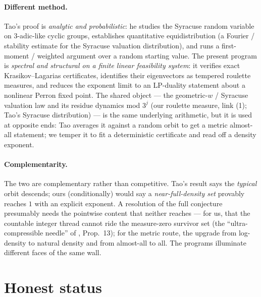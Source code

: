 \documentclass[11pt]{article}
\theoremstyle{definition}
\theoremstyle{remark}
\begin{document}
\paragraph{Different method.}
Tao's proof is \emph{analytic and probabilistic}: he studies the Syracuse random
variable on $3$-adic-like cyclic groups, establishes quantitative equidistribution
(a Fourier / stability estimate for the Syracuse valuation distribution), and
runs a first-moment / weighted argument over a random starting value. The
present program is \emph{spectral and structural on a finite linear feasibility
system}: it verifies exact Krasikov--Lagarias certificates, identifies their
eigenvectors as tempered roulette measures, and reduces the exponent limit to an
LP-duality statement about a nonlinear Perron fixed point. The shared object ---
the geometric-$w$ / Syracuse valuation law and its residue dynamics mod $3^j$
(our roulette measure, link (1); Tao's Syracuse distribution) --- is the same
underlying arithmetic, but it is used at opposite ends: Tao averages it against
a random orbit to get a metric almost-all statement; we temper it to fit a
deterministic certificate and read off a density exponent.

\paragraph{Complementarity.}
The two are complementary rather than competitive. Tao's result says the
\emph{typical} orbit descends; ours (conditionally) would say a
\emph{near-full-density set} provably reaches $1$ with an explicit exponent. A
resolution of the full conjecture presumably needs the pointwise content that
neither reaches --- for us, that the countable integer thread cannot ride the
measure-zero survivor set (the ``ultra-compressible needle'' of \cite{NOTE},
Prop.~13); for the metric route, the upgrade from log-density to natural
density and from almost-all to all. The programs illuminate different faces of
the same wall.

\section{Honest status}
\label{sec:status}
\end{document}
